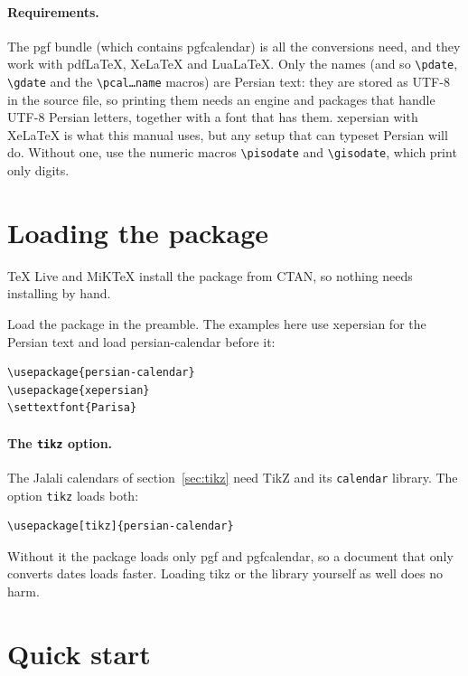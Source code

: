 \documentclass[11pt]{article}
\newcommand\pkg[1]{\textsf{#1}}
\newcommand\cs[1]{\texttt{\textbackslash #1}}
\begin{document}
\paragraph{Requirements.} The \pkg{pgf} bundle (which contains \pkg{pgfcalendar}) is all the
conversions need, and they work with pdf\LaTeX{}, Xe\LaTeX{} and Lua\LaTeX{}. Only the names (and
so \cs{pdate}, \cs{gdate} and the \texttt{\textbackslash pcal\ldots name} macros) are Persian
text: they are stored as UTF-8 in the source file, so printing them needs an engine and packages that
handle UTF-8 Persian letters, together with a font that has them. \pkg{xepersian} with Xe\LaTeX{} is
what this manual uses, but any setup that can typeset Persian will do. Without one, use the numeric
macros \cs{pisodate} and \cs{gisodate}, which print only digits.

\section{Loading the package}\label{sec:installation2}

TeX Live and MiKTeX install the package from CTAN, so nothing needs installing by hand.

Load the package in the preamble. The examples here use \pkg{xepersian} for the Persian text and load
\pkg{persian-calendar} before it:
\begin{verbatim}
\usepackage{persian-calendar}
\usepackage{xepersian}
\settextfont{Parisa}
\end{verbatim}
\paragraph{The \texttt{tikz} option.} The Jalali calendars of section~\ref{sec:tikz} need \pkg{TikZ} and
its \texttt{calendar} library. The option \texttt{tikz} loads both:
\begin{verbatim}
\usepackage[tikz]{persian-calendar}
\end{verbatim}
Without it the package loads only \pkg{pgf} and \pkg{pgfcalendar}, so a document that only converts
dates loads faster. Loading \pkg{tikz} or the library yourself as well does no harm.

\section{Quick start}\label{sec:quick3}
\end{document}
